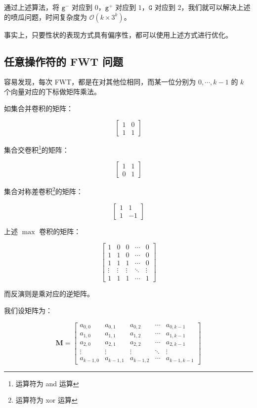 \documentclass[12pt]{article} %
\begin{document}
通过上述算法，将 $\texttt{g}^-$ 对应到 $0$，$\texttt{g}^+$ 对应到 $1$，$\texttt{G}$ 对应到 $2$，我们就可以解决上述的喷瓜问题，时间复杂度为 $\mathcal O(k \times 3^k)$。

事实上，只要性状的表现方式具有偏序性，都可以使用上述方式进行优化。

\subsection{任意操作符的 FWT 问题}

容易发现，每次 FWT，都是在对其他位相同，而某一位分别为 $0, \cdots ,k-1$ 的 $k$ 个向量对应的下标做矩阵乘法。

如集合并卷积的矩阵：

$$\begin{bmatrix} 1 & 0 \\ 1 & 1 \end{bmatrix}$$

集合交卷积\footnote{运算符为 and 运算}的矩阵：

$$\begin{bmatrix} 1 & 1 \\ 0 & 1 \end{bmatrix}$$

集合对称差卷积\footnote{运算符为 xor 运算}的矩阵：

$$\begin{bmatrix} 1 & 1 \\ 1 & -1 \end{bmatrix}$$

上述 $\max$ 卷积的矩阵：

$$\begin{bmatrix} 1& 0 & 0& \cdots & 0\\ 1& 1& 0& \cdots & 0\\ 1& 1 & 1& \cdots & 0\\ \vdots& \vdots& \vdots& \ddots& \vdots\\ 1& 1& 1 & \cdots & 1 \end{bmatrix}$$

而反演则是乘对应的逆矩阵。

我们设矩阵为：

$$\mathbf{M}=\begin{bmatrix} a_{0,0}&  a_{0,1} &  a_{0,2}& \cdots &  a_{0,k-1}\\  a_{1,0}&  a_{1,1}&  a_{1,2}& \cdots &  a_{1,k-1}\\  a_{2,0}&  a_{2,1} &  a_{2,2}& \cdots &  a_{2,k-1}\\ \vdots& \vdots& \vdots& \ddots& \vdots\\  a_{k-1,0}&  a_{k-1,1}&  a_{k-1,2} & \cdots &  a_{k-1,k-1} \end{bmatrix}$$
\end{document}
